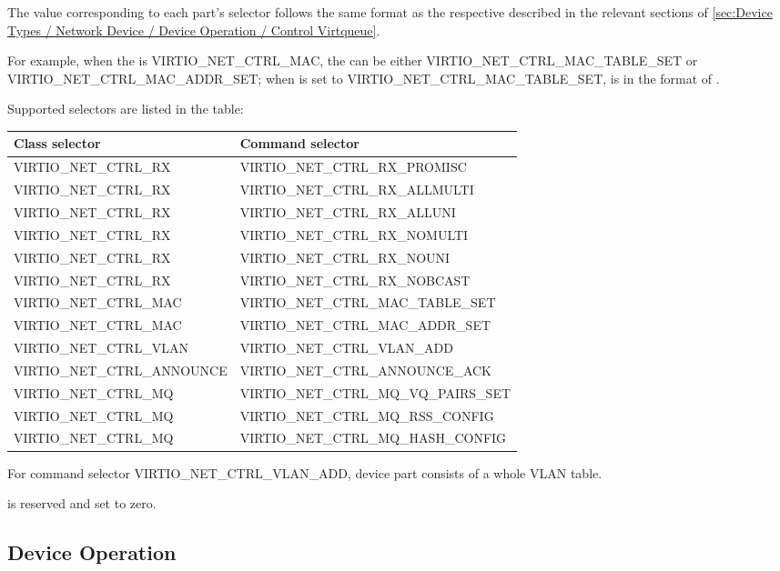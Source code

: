 The value corresponding to each part’s selector follows the same format as the
respective  described in the relevant sections of
\ref{sec:Device Types / Network Device / Device Operation / Control Virtqueue}.

For example, when the  is VIRTIO_NET_CTRL_MAC, the 
can be either VIRTIO_NET_CTRL_MAC_TABLE_SET or VIRTIO_NET_CTRL_MAC_ADDR_SET;
when  is set to VIRTIO_NET_CTRL_MAC_TABLE_SET, 
is in the format of .

Supported selectors are listed in the table:

\begin{tabularx}{\textwidth}{ |l|X| }
\hline
Class selector & Command selector \\
\hline \hline
VIRTIO_NET_CTRL_RX & VIRTIO_NET_CTRL_RX_PROMISC \\
\hline
VIRTIO_NET_CTRL_RX & VIRTIO_NET_CTRL_RX_ALLMULTI \\
\hline
VIRTIO_NET_CTRL_RX & VIRTIO_NET_CTRL_RX_ALLUNI \\
\hline
VIRTIO_NET_CTRL_RX & VIRTIO_NET_CTRL_RX_NOMULTI \\
\hline
VIRTIO_NET_CTRL_RX & VIRTIO_NET_CTRL_RX_NOUNI \\
\hline
VIRTIO_NET_CTRL_RX & VIRTIO_NET_CTRL_RX_NOBCAST \\
\hline
VIRTIO_NET_CTRL_MAC & VIRTIO_NET_CTRL_MAC_TABLE_SET \\
\hline
VIRTIO_NET_CTRL_MAC & VIRTIO_NET_CTRL_MAC_ADDR_SET \\
\hline
VIRTIO_NET_CTRL_VLAN & VIRTIO_NET_CTRL_VLAN_ADD \\
\hline
VIRTIO_NET_CTRL_ANNOUNCE & VIRTIO_NET_CTRL_ANNOUNCE_ACK \\
\hline
VIRTIO_NET_CTRL_MQ & VIRTIO_NET_CTRL_MQ_VQ_PAIRS_SET \\
\hline
VIRTIO_NET_CTRL_MQ & VIRTIO_NET_CTRL_MQ_RSS_CONFIG \\
\hline
VIRTIO_NET_CTRL_MQ & VIRTIO_NET_CTRL_MQ_HASH_CONFIG \\
\hline
\hline
\end{tabularx}

For command selector VIRTIO_NET_CTRL_VLAN_ADD, device part consists of a whole
VLAN table.

 is reserved and set to zero.

\subsection{Device Operation}\label{sec:Device Types / Network Device / Device Operation}

